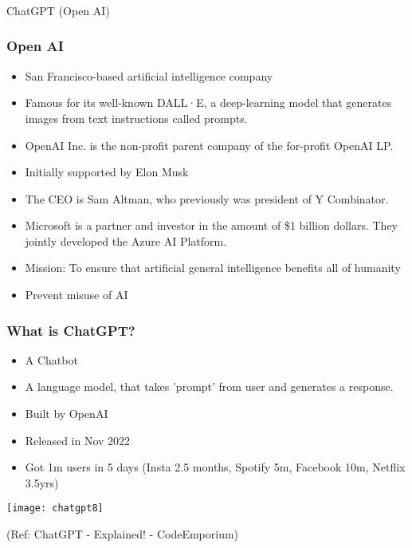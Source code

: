 \begin{frame}[fragile]\frametitle{}
\begin{center}
{\Large ChatGPT (Open AI)}
\end{center}
\end{frame}



\begin{frame}[fragile]\frametitle{Open AI}


\begin{itemize}
\item San Francisco-based artificial intelligence company
\item Famous for its well-known DALL·E, a deep-learning model that generates images from text instructions called prompts.
\item OpenAI Inc. is the non-profit parent company of the for-profit OpenAI LP.
\item Initially supported by Elon Musk
\item The CEO is Sam Altman, who previously was president of Y Combinator.
\item Microsoft is a partner and investor in the amount of \$1 billion dollars. They jointly developed the Azure AI Platform.
\item Mission: To ensure that artificial general intelligence benefits all of humanity
\item Prevent misuse of AI
\end{itemize}	 

\end{frame}

\begin{frame}[fragile]\frametitle{What is ChatGPT?}


\begin{itemize}
\item A Chatbot
\item A language model, that takes 'prompt' from user and generates a response.
\item Built by OpenAI
\item Released in Nov 2022
\item Got 1m users in 5 days  (Insta 2.5 months, Spotify 5m, Facebook 10m, Netflix 3.5yrs)
\end{itemize}	 

			\begin{center}
			\texttt{[image: chatgpt8]}
			\end{center}		
			
			
			{\tiny (Ref: ChatGPT - Explained! - CodeEmporium)}
			
			
\end{frame}

